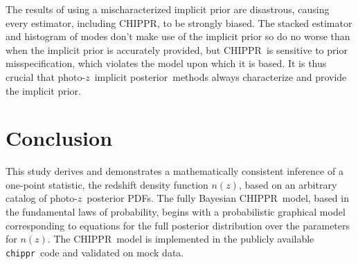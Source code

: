 \documentclass[iop]{emulateapj}
\newcommand{\todo}[3]{{\color{#2}\emph{#1}: #3}}
\newcommand{\que}[1]{\todo{Question}{cyan}{#1}}
\newcommand{\Sect}[1]{Section~\ref{#1}}
\newcommand{\Tab}[1]{Table~\ref{#1}}
\newcommand{\project}[1]{\textsc{#1}}
\newcommand{\Chippr}{\project{CHIPPR}}%
\newcommand{\repo}[1]{\texttt{#1}}
\newcommand{\chippr}{\repo{chippr}}
\newcommand{\pz}{photo-$z$}
\newcommand{\pzpdf}{\pz\ posterior PDF}%
\newcommand{\pzip}{\pz\ implicit posterior}
\newcommand{\nz}{$n(z)$}
\begin{document}
The results of using a mischaracterized implicit prior are disastrous, causing every estimator, including \Chippr, to be strongly biased.
The stacked estimator and histogram of modes don't make use of the implicit prior so do no worse than when the implicit prior is accurately provided, but \Chippr\ is sensitive to prior misspecification, which violates the model upon which it is based.
It is thus crucial that \pzip\ methods always characterize and provide the implicit prior.


\section{Conclusion}
\label{sec:con}


This study derives and demonstrates a mathematically consistent inference of a one-point statistic, the redshift density function \nz, based on an arbitrary catalog of \pzpdf s.
The fully Bayesian \Chippr\ model, based in the fundamental laws of probability, begins with a probabilistic graphical model corresponding to equations for the full posterior distribution over the parameters for \nz.
The \Chippr\ model is implemented in the publicly available \chippr\ code and validated on mock data.

\end{document}
